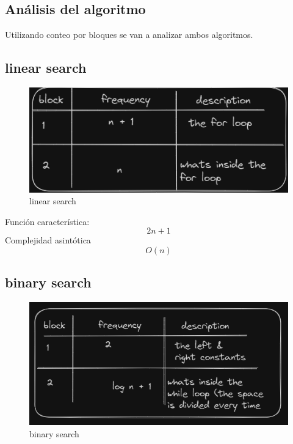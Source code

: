 \documentclass{article}
\begin{document}
\begin{multicols}{2}
\section{Análisis del algoritmo}\label{AdA}
  Utilizando conteo por bloques se van a analizar ambos algoritmos.
  \subsection*{linear search}
  \begin{figure}[H]
    \includegraphics[scale=0.6]{imgs/t0.png}
    \caption{linear search}
    \label{Fig:1}
  \end{figure}
  Función característica: 
  \begin{equation*}
    2n + 1
  \end{equation*}
  Complejidad asintótica
  \begin{equation*}
    O(n)
  \end{equation*}

  \subsection*{binary search}
  \begin{figure}[H]
    \includegraphics[scale=0.5]{imgs/t1.png}
    \caption{binary search}
    \label{Fig:2}
  \end{figure}


\end{multicols}
\end{document}
